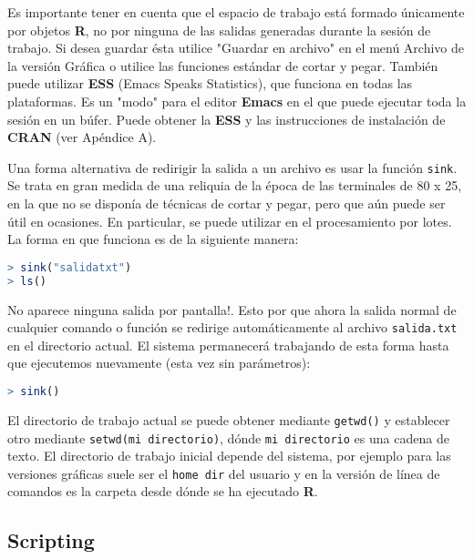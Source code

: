 Es importante tener en cuenta que el espacio de trabajo está formado únicamente
por objetos \textbf{R}, no por ninguna de las salidas generadas durante la
sesión de trabajo.  Si desea guardar ésta utilice "Guardar en archivo" en el
menú Archivo de la versión Gráfica o utilice las funciones estándar de cortar y
pegar. También puede utilizar \textbf{ESS} (Emacs Speaks Statistics), que
funciona en todas las plataformas. Es un "modo" para el editor \textbf{Emacs}
en el que puede ejecutar toda la sesión en un búfer. Puede obtener la
\textbf{ESS} y las instrucciones de instalación de \textbf{CRAN} (ver Apéndice
A).

Una forma alternativa de redirigir la salida a un archivo es usar la función
\texttt{sink}. Se trata en gran medida de una reliquia de la época de las
terminales de 80 x 25, en la que no se disponía de técnicas de cortar y pegar,
pero que aún puede ser útil en ocasiones. En particular, se puede utilizar en
el procesamiento por lotes. La forma en que funciona es de la siguiente manera:

\begin{lstlisting}[language=R]
> sink("salidatxt")
> ls()
\end{lstlisting}

No aparece ninguna salida por pantalla!. Esto por que ahora la salida normal de
cualquier comando o función se redirige automáticamente al archivo
\texttt{salida.txt} en el directorio actual.  El sistema permanecerá trabajando
de esta forma hasta que ejecutemos nuevamente (esta vez sin parámetros):

\begin{lstlisting}[language=R]
> sink()
\end{lstlisting}

El directorio de trabajo actual se puede obtener mediante \texttt{getwd()} y
establecer otro mediante \texttt{setwd(mi directorio)}, dónde \texttt{mi
directorio} es una cadena de texto. El directorio de trabajo inicial depende
del sistema, por ejemplo para las versiones gráficas suele ser el \texttt{home
dir} del usuario y en la versión de línea de comandos es la carpeta desde dónde
se ha ejecutado \textbf{R}.

\subsection{Scripting}\label{Scripting}

